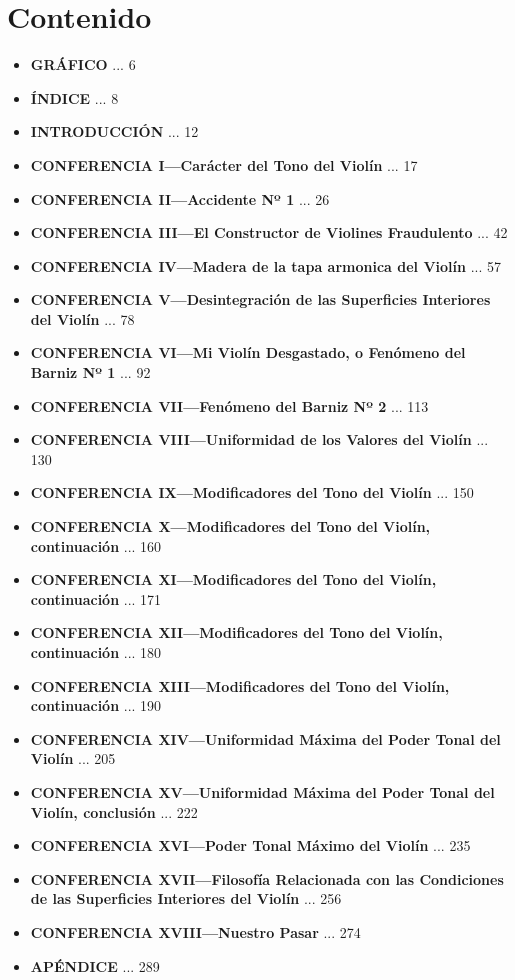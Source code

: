 \documentclass[12pt]{book}
\begin{document}
\chapter*{Contenido}

\begin{itemize}
    \item \textbf{GRÁFICO} ... 6
    \item \textbf{ÍNDICE} ... 8
    \item \textbf{INTRODUCCIÓN} ... 12
    \item \textbf{CONFERENCIA I—Carácter del Tono del Violín} ... 17
    \item \textbf{CONFERENCIA II—Accidente Nº 1} ... 26
    \item \textbf{CONFERENCIA III—El Constructor de Violines Fraudulento} ... 42
    \item \textbf{CONFERENCIA IV—Madera de la tapa armonica del Violín} ... 57
    \item \textbf{CONFERENCIA V—Desintegración de las Superficies Interiores del Violín} ... 78
    \item \textbf{CONFERENCIA VI—Mi Violín Desgastado, o Fenómeno del Barniz Nº 1} ... 92
    \item \textbf{CONFERENCIA VII—Fenómeno del Barniz Nº 2} ... 113
    \item \textbf{CONFERENCIA VIII—Uniformidad de los Valores del Violín} ... 130
    \item \textbf{CONFERENCIA IX—Modificadores del Tono del Violín} ... 150
    \item \textbf{CONFERENCIA X—Modificadores del Tono del Violín, continuación} ... 160
    \item \textbf{CONFERENCIA XI—Modificadores del Tono del Violín, continuación} ... 171
    \item \textbf{CONFERENCIA XII—Modificadores del Tono del Violín, continuación} ... 180
    \item \textbf{CONFERENCIA XIII—Modificadores del Tono del Violín, continuación} ... 190
    \item \textbf{CONFERENCIA XIV—Uniformidad Máxima del Poder Tonal del Violín} ... 205
    \item \textbf{CONFERENCIA XV—Uniformidad Máxima del Poder Tonal del Violín, conclusión} ... 222
    \item \textbf{CONFERENCIA XVI—Poder Tonal Máximo del Violín} ... 235
    \item \textbf{CONFERENCIA XVII—Filosofía Relacionada con las Condiciones de las Superficies Interiores del Violín} ... 256
    \item \textbf{CONFERENCIA XVIII—Nuestro Pasar} ... 274
    \item \textbf{APÉNDICE} ... 289
\end{itemize}
\end{document}
